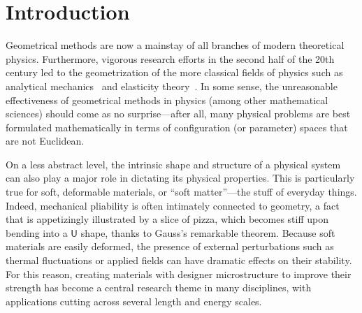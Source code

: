 
\chapter{Introduction}


Geometrical methods are now a mainstay of all branches of modern theoretical physics.
Furthermore, vigorous research efforts in the second half of the 20th century led to the geometrization of the more classical fields of physics such as analytical mechanics~\cite{sudarshan1974,arnold1978,souder2017} and elasticity theory~\cite{marsden1994,audoly2010}.
In some sense, the unreasonable effectiveness of geometrical methods in physics (among other mathematical sciences) should come as no surprise---after all, many physical problems are best formulated mathematically in terms of configuration (or parameter) spaces that are not Euclidean.

On a less abstract level, the intrinsic shape and structure of a physical system can also play a major role in dictating its physical properties.
This is particularly true for soft, deformable materials, or ``soft matter''---the stuff of everyday things.
Indeed, mechanical pliability is often intimately connected to geometry, a fact that is appetizingly illustrated by a slice of pizza, which becomes stiff upon bending into a $\textsf{U}$ shape, thanks to Gauss's remarkable theorem.
Because soft materials are easily deformed, the presence of external perturbations such as thermal fluctuations or applied fields can have dramatic effects on their stability.
For this reason, creating materials with designer microstructure to improve their strength has become a central research theme in many disciplines, with applications cutting across several length and energy scales.

